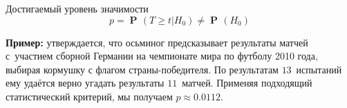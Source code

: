 \documentclass[9pt,pdf,utf8,hyperref={unicode},aspectratio=169]{beamer}
\DeclareMathOperator{\prob}{\mathbf{P}\!}
\begin{document}
\begin{frame}{Достигаемый уровень значимости}
$$p = \prob\left(T\geq t\left|H_0\right.\right) \neq \prob \left(H_0\right)$$

\textbf{Пример:} утверждается, что осьминог предсказывает результаты матчей с~участием сборной Германии на чемпионате мира по футболу 2010 года, выбирая кормушку с флагом страны-победителя.
По результатам $13$~испытаний ему удаётся верно угадать результаты $11$~матчей.  Применяя подходящий статистический критерий, мы получаем $p\approx 0.0112.$

\bigskip


\end{frame}
\end{document}
